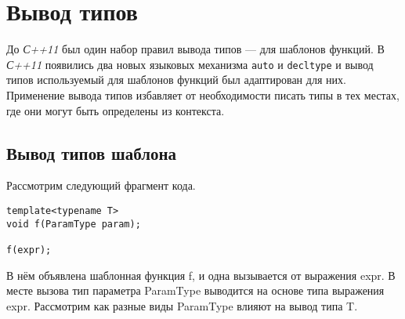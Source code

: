 	\section{Вывод типов}
	До \textit{С++11} был один набор правил вывода типов --- для шаблонов функций. В \textit{С++11} появились два новых языковых механизма \texttt{auto} и \texttt{decltype} и вывод типов используемый для шаблонов функций был адаптирован для них.
	Применение вывода типов избавляет от необходимости писать типы в тех местах, где они могут быть определены из контекста.
	
	\subsection{Вывод типов шаблона}
		Рассмотрим следующий фрагмент кода.
		
\begin{verbatim}
template<typename T>
void f(ParamType param);

f(expr);
\end{verbatim}
        В нём объявлена шаблонная функция f, и одна вызывается от выражения expr. В месте вызова тип параметра ParamType выводится на основе типа выражения expr. Рассмотрим как разные виды ParamType влияют на вывод типа T.

